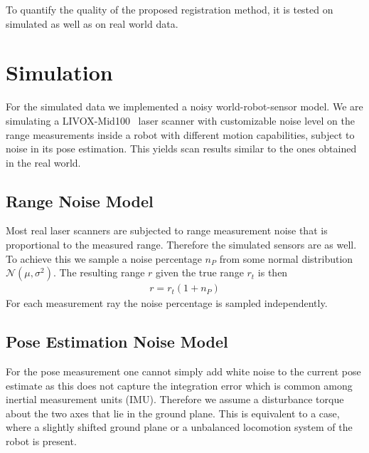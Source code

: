 To quantify the quality of the proposed registration method, it is tested on simulated as well as on real world data. 

\section{Simulation}

For the simulated data we implemented a noisy world-robot-sensor model.  
We are simulating a LIVOX-Mid100~\cite{LivoxMid40-100} laser scanner with customizable noise level on the range measurements inside a robot with different motion capabilities, subject to noise in its pose estimation. This yields scan results similar to the ones obtained in the real world.

\subsection{Range Noise Model}

Most real laser scanners are subjected to range measurement noise that is proportional to the measured range. 
Therefore the simulated sensors are as well. 
To achieve this we sample a noise percentage $n_P$ from some normal distribution $\mathcal{N}(\mu,\sigma^2)$. 
The resulting range $r$ given the true range $r_t$ is then
\begin{align}
	r = r_t(1+n_P)
\end{align}
For each measurement ray the noise percentage is sampled independently. 

\subsection{Pose Estimation Noise Model} 

For the pose measurement one cannot simply add white noise to the current pose estimate as this does not capture the integration error which is common among inertial measurement units (IMU). 
Therefore we assume a disturbance torque about the two axes that lie in the ground plane. 
This is equivalent to a case, where a slightly shifted ground plane or a unbalanced locomotion system of the robot is present.  

